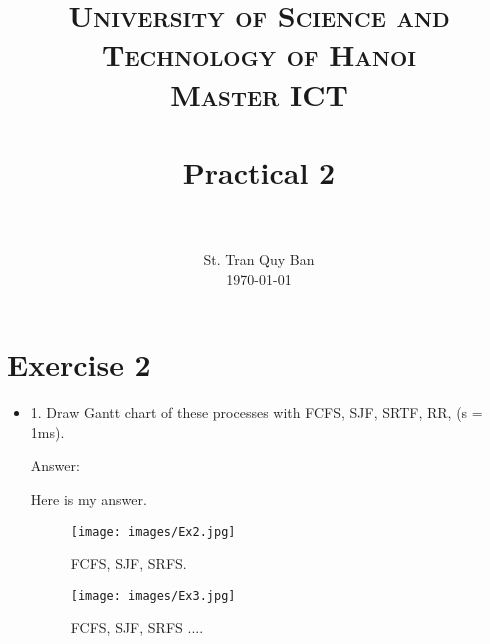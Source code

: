 \documentclass[paper=a4, fontsize=11pt]{scrartcl}
\title{
		\usefont{OT1}{bch}{b}{n}
		\normalfont \normalsize \textsc{University of Science and Technology of Hanoi \\ Master ICT} \\ [25pt]
		\horrule{0.5pt} \\[0.4cm]
		\huge Practical 2 \\
		\horrule{2pt} \\[0.5cm]
}
\author{
		\normalfont 								\normalsize
        St. Tran Quy Ban\\[-3pt]		\normalsize
        \today
}
\date{}
\numberwithin{equation}{section}		%
\numberwithin{figure}{section}			%
\numberwithin{table}{section}				%
\begin{document}
\maketitle

\section{Exercise 2}

\begin{itemize}
	\item 1. Draw Gantt chart of these processes with FCFS, SJF, SRTF, RR, (s = 1ms).
	
	Answer: 
	
	Here is my answer.
	
	\begin{figure}[ht]
	\centering
	\texttt{[image: images/Ex2.jpg]}
	\caption[GANTT]{FCFS, SJF, SRFS.}
	\end{figure}
	

	
	\begin{figure}[ht]
		\centering
		\texttt{[image: images/Ex3.jpg]}
		\caption[GANTT]{FCFS, SJF, SRFS ....}
		\end{figure}
	

	 
	
		
    
   
\end{itemize}



\end{document}
